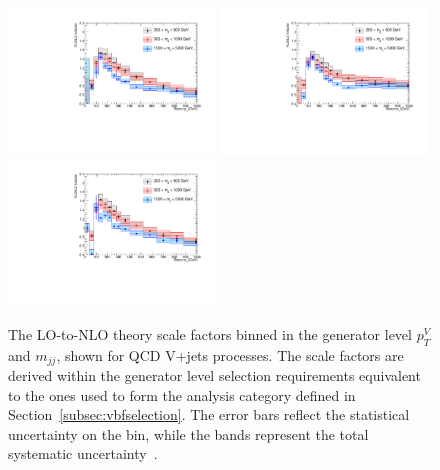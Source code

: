 \begin{figure}[htbp]
    \begin{center}
        \includegraphics[width=0.49\textwidth]{Objects/kfactor_VBF_zjet_born_default.pdf}
        \includegraphics[width=0.49\textwidth]{Objects/kfactor_VBF_wjet_born_default.pdf} \\
        \includegraphics[width=0.49\textwidth]{Objects/kfactor_VBF_znn_born_default.pdf}
        \caption{
            The LO-to-NLO theory scale factors binned in the generator level $p_T^V$ and $m_{jj}$, shown for QCD V+jets processes.
            The scale factors are derived within the generator level selection requirements equivalent to the ones used to form the analysis category defined in Section~\ref{subsec:vbfselection}. The error bars reflect the statistical uncertainty on the bin, while the bands represent the total systematic uncertainty~\cite{note:AN_19_257}.}
      \label{fig:theory_sf_qcd_nlo_2d}
    \end{center}
  \end{figure}
  

